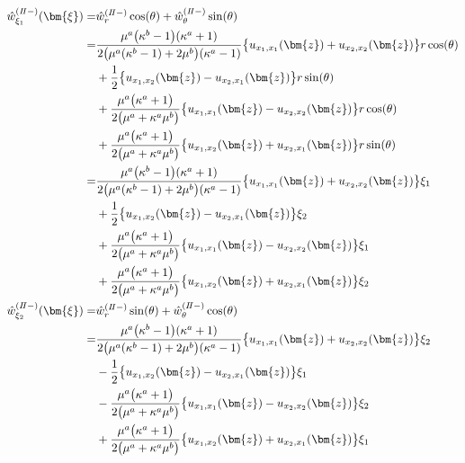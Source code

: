 \begin{align}
	\hat{w}_{\xi_{1}}^{(I\hspace{-.15em}I-)}(\bm{\xi})
	=&\hat{w}_{r}^{(I\hspace{-.15em}I-)}\cos(\theta)+\hat{w}_{\theta}^{(I\hspace{-.15em}I-)}\sin(\theta)
	\nonumber
	\\
	=&\frac{\mu^{a}\bigl(\kappa^{b}-1\bigr)(\kappa^{a}+1)}{2\bigl(\mu^{a}(\kappa^{b}-1)+2\mu^{b}\bigr)(\kappa^{a}-1)}
		\bigl\{u_{x_{1},x_{1}}(\bm{z})+u_{x_{2},x_{2}}(\bm{z})\bigr\}r\cos(\theta)
		\nonumber
		\\
		&+\frac{1}{2}\bigl\{u_{x_{1},x_{2}}(\bm{z})-u_{x_{2},x_{1}}(\bm{z})\bigr\}r\sin(\theta)
		\nonumber
		\\
		&+\frac{\mu^{a}\bigl(\kappa^{a}+1\bigr)}{2\bigl(\mu^{a}+\kappa^{a}\mu^{b}\bigr)}
		\bigl\{u_{x_{1},x_{1}}(\bm{z})-u_{x_{2},x_{2}}(\bm{z})\bigr\}r\cos(\theta)
		\nonumber
		\\
		&+\frac{\mu^{a}\bigl(\kappa^{a}+1\bigr)}{2\bigl(\mu^{a}+\kappa^{a}\mu^{b}\bigr)}
		\bigl\{u_{x_{1},x_{2}}(\bm{z})+u_{x_{2},x_{1}}(\bm{z})\bigr\}r\sin(\theta)
		\nonumber
	\\
	=&\frac{\mu^{a}\bigl(\kappa^{b}-1\bigr)(\kappa^{a}+1)}{2\bigl(\mu^{a}(\kappa^{b}-1)+2\mu^{b}\bigr)(\kappa^{a}-1)}
		\bigl\{u_{x_{1},x_{1}}(\bm{z})+u_{x_{2},x_{2}}(\bm{z})\bigr\}\xi_{1}
		\nonumber
		\\
		&+\frac{1}{2}\bigl\{u_{x_{1},x_{2}}(\bm{z})-u_{x_{2},x_{1}}(\bm{z})\bigr\}\xi_{2}
		\nonumber
		\\
		&+\frac{\mu^{a}\bigl(\kappa^{a}+1\bigr)}{2\bigl(\mu^{a}+\kappa^{a}\mu^{b}\bigr)}
		\bigl\{u_{x_{1},x_{1}}(\bm{z})-u_{x_{2},x_{2}}(\bm{z})\bigr\}\xi_{1}
		\nonumber
		\\
		&+\frac{\mu^{a}\bigl(\kappa^{a}+1\bigr)}{2\bigl(\mu^{a}+\kappa^{a}\mu^{b}\bigr)}
		\bigl\{u_{x_{1},x_{2}}(\bm{z})+u_{x_{2},x_{1}}(\bm{z})\bigr\}\xi_{2}
	\\
	\hat{w}_{\xi_{2}}^{(I\hspace{-.15em}I-)}(\bm{\xi})
	=&\hat{w}_{r}^{(I\hspace{-.15em}I-)}\sin(\theta)+\hat{w}_{\theta}^{(I\hspace{-.15em}I-)}\cos(\theta)
	\nonumber
	\\
	=&\frac{\mu^{a}\bigl(\kappa^{b}-1\bigr)(\kappa^{a}+1)}{2\bigl(\mu^{a}(\kappa^{b}-1)+2\mu^{b}\bigr)(\kappa^{a}-1)}
			\bigl\{u_{x_{1},x_{1}}(\bm{z})+u_{x_{2},x_{2}}(\bm{z})\bigr\}\xi_{2}
		\nonumber
		\\
		&-\frac{1}{2}\bigl\{u_{x_{1},x_{2}}(\bm{z})-u_{x_{2},x_{1}}(\bm{z})\bigr\}\xi_{1}
		\nonumber
		\\
		&-\frac{\mu^{a}\bigl(\kappa^{a}+1\bigr)}{2\bigl(\mu^{a}+\kappa^{a}\mu^{b}\bigr)}
		\bigl\{u_{x_{1},x_{1}}(\bm{z})-u_{x_{2},x_{2}}(\bm{z})\bigr\}\xi_{2}
		\nonumber
		\\
		&+\frac{\mu^{a}\bigl(\kappa^{a}+1\bigr)}{2\bigl(\mu^{a}+\kappa^{a}\mu^{b}\bigr)}
		\bigl\{u_{x_{1},x_{2}}(\bm{z})+u_{x_{2},x_{1}}(\bm{z})\bigr\}\xi_{1}
\end{align}
